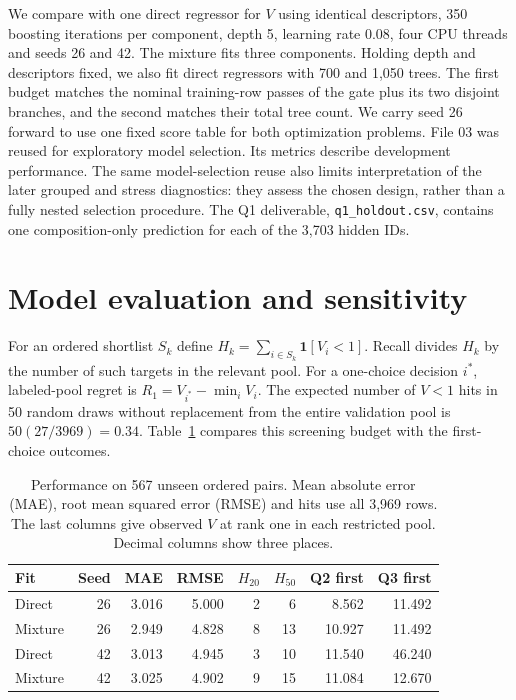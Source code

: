 We compare with one direct regressor for $V$ using identical descriptors, 350 boosting iterations per component, depth 5, learning rate 0.08, four CPU threads and seeds 26 and 42. The mixture fits three components. Holding depth and descriptors fixed, we also fit direct regressors with 700 and 1,050 trees. The first budget matches the nominal training-row passes of the gate plus its two disjoint branches, and the second matches their total tree count. We carry seed 26 forward to use one fixed score table for both optimization problems. File 03 was reused for exploratory model selection. Its metrics describe development performance. The same model-selection reuse also limits interpretation of the later grouped and stress diagnostics: they assess the chosen design, rather than a fully nested selection procedure. The Q1 deliverable, \texttt{q1\_holdout.csv}, contains one composition-only prediction for each of the 3,703 hidden IDs.


\section{Model evaluation and sensitivity}
For an ordered shortlist $S_k$ define $H_k=\sum_{i\in S_k}\mathbf1[V_i<1]$. Recall divides $H_k$ by the number of such targets in the relevant pool. For a one-choice decision $i^*$, labeled-pool regret is $R_1=V_{i^*}-\min_i V_i$. The expected number of $V<1$ hits in 50 random draws without replacement from the entire validation pool is $50(27/3969)=0.34$. Table~\ref{tab:val} compares this screening budget with the first-choice outcomes.

\begin{table}[htbp]
\caption{Performance on 567 unseen ordered pairs. Mean absolute error (MAE), root mean squared error (RMSE) and hits use all 3,969 rows. The last columns give observed $V$ at rank one in each restricted pool. Decimal columns show three places.}\label{tab:val}
\centering\small\begin{tabular}{lrrrrrrr}
\toprule Fit & Seed & \multicolumn{1}{c}{MAE} & \multicolumn{1}{c}{RMSE} & $H_{20}$ & $H_{50}$ & \multicolumn{1}{c}{Q2 first} & \multicolumn{1}{c}{Q3 first}\\\midrule
Direct &26&3.016&5.000&2&6&8.562&11.492\\
Mixture &26&2.949&4.828&8&13&10.927&11.492\\
Direct &42&3.013&4.945&3&10&11.540&46.240\\
Mixture &42&3.025&4.902&9&15&11.084&12.670\\\bottomrule
\end{tabular}
\end{table}

